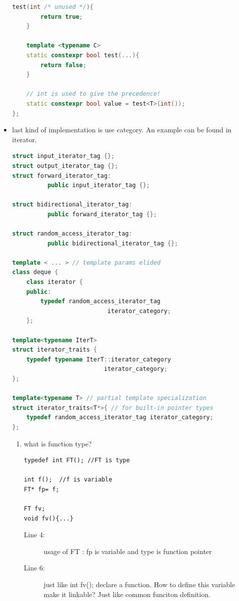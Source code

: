 \documentclass[a4paper,11pt,twoside]{book}
\begin{document}
\begin{itemize}
\begin{lstlisting}[frame=single, language=c++]
	test(int /* unused */){
		return true;
	}
	
	template <typename C>
	static constexpr bool test(...){
		return false;
	}
	
	// int is used to give the precedence!
	static constexpr bool value = test<T>(int());
};
\end{lstlisting}
	
\item last kind of implementation is use category. An example can be found in iterator.
	
\begin{lstlisting}[frame=single, language=c++]
struct input_iterator_tag {};
struct output_iterator_tag {};
struct forward_iterator_tag: 
          public input_iterator_tag {};
          
struct bidirectional_iterator_tag: 
          public forward_iterator_tag {};
          
struct random_access_iterator_tag: 
          public bidirectional_iterator_tag {};
	
template < ... > // template params elided
class deque {
	class iterator {
	public:
		typedef random_access_iterator_tag 
		                   iterator_category;
	};
	
template<typename IterT>
struct iterator_traits {
	typedef typename IterT::iterator_category 
	                      iterator_category;
};
	
template<typename T> // partial template specialization
struct iterator_traits<T*>{ // for built-in pointer types
	typedef random_access_iterator_tag iterator_category;
};
\end{lstlisting}

\begin{enumerate}
	\item what is function type?
\begin{lstlisting}
typedef int FT(); //FT is type

int f();  //f is variable
FT* fp= f; 

FT fv; 
void fv(){...} 
\end{lstlisting}
	\begin{description}
		\item[Line 4:] usage of FT : fp is variable and type is function pointer
		\item[Line 6:] just like int fv(); declare a function. How to define this variable make it linkable? Just like common funciton definition.
	\end{description}
	

\end{enumerate}
\end{itemize}
\end{document}
